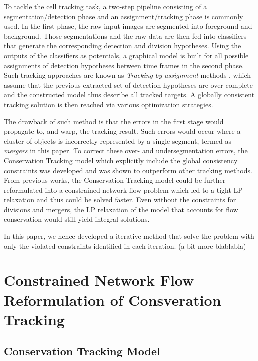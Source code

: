 \documentclass[10pt,twocolumn,letterpaper]{article}
\begin{document}
To tackle the cell tracking task, a two-step pipeline \cite{yilmaz2006object} consisting of a segmentation/detection phase and an assignment/tracking phase is commonly used. In the first phase, the raw input images are segmented into foreground and background. Those segmentations and the raw data are then fed into classifiers that generate the corresponding detection and division hypotheses. Using the outputs of the classifiers as potentials, a graphical model is built for all possible assignments of  detection hypotheses between time frames in the second phase. Such tracking approaches are known as \textit{Tracking-by-assignment} methods \cite{bise2011reliable,padfield2011coupled}, which assume that the previous extracted set of detection hypotheses are over-complete and the constructed model thus describe all tracked targets. A globally consistent tracking solution is then reached via various optimization strategies.

The drawback of such method is that the errors in the first stage would propagate to, and warp, the tracking result. Such errors would occur where a cluster of objects is incorrectly represented by a single segment, termed as \textit{mergers} in this paper. To correct these over- and undersegmentation errors, the Conservation Tracking model \cite{schiegg2013conservation} which explicitly include the global consistency constraints was developed and was shown to outperform other tracking methods. From previous works, the Conservation Tracking model could be further reformulated into a constrained network flow problem which led to a tight LP relaxation and thus could be solved faster. Even without the constraints for divisions and mergers, the LP relaxation of the model that accounts for flow conservation would still yield integral solutions.

In this paper, we hence developed a iterative method that solve the problem with only the violated constraints identified in each iteration. (a bit more blablabla)


\section{Constrained Network Flow Reformulation of Consveration Tracking}


\subsection{Conservation Tracking Model}
\end{document}
